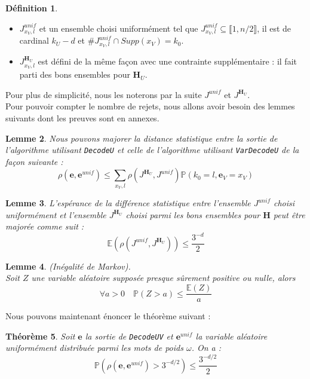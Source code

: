 \documentclass[12pt]{article}
\theoremstyle{plain}
\newtheorem{thm}{Théorème}[section]
\newtheorem{lemme}[thm]{Lemme}
\theoremstyle{definition}
\newtheorem{defi}[thm]{Définition}
\newcommand{\e}{\mathbf{e}}
\begin{document}
\begin{defi}\
\begin{itemize}
\item $J_{x_V,l}^{unif}$ et un ensemble choisi uniformément tel que $J_{x_V,l}^{unif}\subseteq \llbracket 1,n/2 \rrbracket$, il est de cardinal $k_U-d$ et $\#J_{x_V,l}^{unif}\cap Supp(x_V) = k_0$. 
\item $J_{x_V, l}^{\mathbf{H}_U}$ est défini de la même façon avec une contrainte supplémentaire : il fait parti des bons ensembles pour $\mathbf{H}_U$.
\end{itemize}
\end{defi}

\noindent Pour plus de simplicité, nous les noterons par la suite $J^{unif}$ et $J^{\mathbf{H}_U}$.\\

\noindent Pour pouvoir compter le nombre de rejets, nous allons avoir besoin des lemmes suivants dont les preuves sont en annexes.

\begin{lemme}\label{maj_dist_e_eunif}
Nous pouvons majorer la distance statistique entre la sortie de l'algorithme utilisant \verb|DecodeU| et celle de l'algorithme utilisant \verb|VarDecodeU| de la façon suivante :
$$ \rho\left(\e ,\e^{unif}\right) \leq \sum\limits_{x_V,l} \rho\left(J^{\mathbf{H}_U},J^{unif}\right)\mathbb{P}\left(k_0 = l, \e_V = x_V\right) $$ 
\end{lemme}


\begin{lemme}\label{esp}
L'espérance de la différence statistique entre l'ensemble $J^{unif}$ choisi uniformément et l'ensemble $J^{\mathbf{H}_U}$ choisi parmi les bons ensembles pour $\mathbf{H}$ peut être majorée comme suit :
$$ \mathbb{E}\left(\rho\left(J^{unif},J^{\mathbf{H}_U}\right)\right) \leq \frac{3^{-d}}{2} $$
\end{lemme}

\begin{lemme}\label{markov}(Inégalité de Markov).\\
Soit $Z$ une variable aléatoire supposée presque sûrement positive ou nulle, alors $$\forall a>0\quad \mathbb{P}(Z > a) \leq \frac{\mathbb{E}(Z)}{a}$$
\end{lemme}

\noindent Nous pouvons maintenant énoncer le théorème suivant :

\begin{thm}\label{rejet}
Soit $\e$ la sortie de \verb|DecodeUV| et $\e^{unif}$ la variable aléatoire uniformément distribuée parmi les mots de poids $\omega$. On a :
$$ \mathbb{P}\left(\rho(\e,\e^{unif})>3^{-d/2}\right) \leq \frac{3^{-d/2}}{2} $$
\end{thm}
\end{document}
